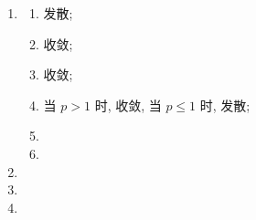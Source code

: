 \documentclass[a4paper, 11pt]{ctexart}
\begin{document}
\begin{enumerate}
    \item %
        \begin{multicols}{2}
            \begin{enumerate}[(1)]
                \item %
                    发散;
                \item %
                    收敛;
                \item %
                    收敛;
                \item %
                    当 $p > 1$ 时, 收敛, 当 $p \leq 1$ 时, 发散;
                \item %
                \item %
            \end{enumerate}
        \end{multicols}
    \item %
    \item %
    \item %
\end{enumerate}
\end{document}
